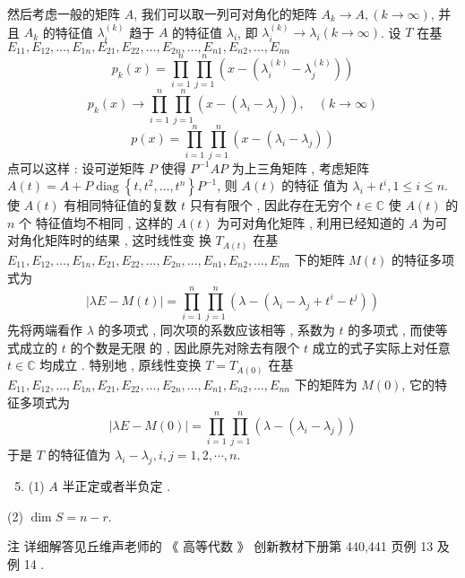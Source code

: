 \documentclass[10pt]{article}
\begin{document}
 然后考虑一般的矩阵  $A$,  我们可以取一列可对角化的矩阵  $A_{k} \rightarrow A,(k \rightarrow \infty)$,  并且  $A_{k}$  的特征值  $\lambda_{i}^{(k)}$  趋于  $A$  的特征值  $\lambda_{i}$,  即  $\lambda_{i}^{(k)} \rightarrow \lambda_{i}(k \rightarrow \infty)$.  设  $T$  在基  $E_{11}, E_{12}, \ldots, E_{1 n}, E_{21}, E_{22}, \ldots, E_{2 n}, \ldots, E_{n 1}, E_{n 2}, \ldots, E_{n n}$
$$
p_{k}(x)=\prod_{i=1}^{n} \prod_{j=1}^{n}\left(x-\left(\lambda_{i}^{(k)}-\lambda_{j}^{(k)}\right)\right)
$$
$$
p_{k}(x) \rightarrow \prod_{i=1}^{n} \prod_{j=1}^{n}\left(x-\left(\lambda_{i}-\lambda_{j}\right)\right), \quad(k \rightarrow \infty)
$$
$$
p(x)=\prod_{i=1}^{n} \prod_{j=1}^{n}\left(x-\left(\lambda_{i}-\lambda_{j}\right)\right)
$$
 点可以这样 :  设可逆矩阵  $P$  使得  $P^{-1} A P$  为上三角矩阵 ,  考虑矩阵  $A(t)=A+P \operatorname{diag}\left\{t, t^{2}, \ldots, t^{n}\right\} P^{-1}$,  则  $A(t)$  的特征   值为  $\lambda_{i}+t^{i}, 1 \leq i \leq n$.  使  $A(t)$  有相同特征值的复数  $t$  只有有限个 ,  因此存在无穷个  $t \in \mathbb{C}$  使  $A(t)$  的  $n$  个   特征值均不相同 ,  这样的  $A(t)$  为可对角化矩阵 ,  利用已经知道的  $A$  为可对角化矩阵时的结果 ,  这时线性变   换  $T_{A(t)}$  在基  $E_{11}, E_{12}, \ldots, E_{1 n}, E_{21}, E_{22}, \ldots, E_{2 n}, \ldots, E_{n 1}, E_{n 2}, \ldots, E_{n n}$  下的矩阵  $M(t)$  的特征多项式为 
$$
|\lambda E-M(t)|=\prod_{i=1}^{n} \prod_{j=1}^{n}\left(\lambda-\left(\lambda_{i}-\lambda_{j}+t^{i}-t^{j}\right)\right)
$$
 先将两端看作  $\lambda$  的多项式 ,  同次项的系数应该相等 ,  系数为  $t$  的多项式 ,  而使等式成立的  $t$  的个数是无限   的 ,  因此原先对除去有限个  $t$  成立的式子实际上对任意  $t \in \mathbb{C}$  均成立 .  特别地 ,  原线性变换  $T=T_{A(0)}$  在基  $E_{11}, E_{12}, \ldots, E_{1 n}, E_{21}, E_{22}, \ldots, E_{2 n}, \ldots, E_{n 1}, E_{n 2}, \ldots, E_{n n}$  下的矩阵为  $M(0)$,  它的特征多项式为 
$$
|\lambda E-M(0)|=\prod_{i=1}^{n} \prod_{j=1}^{n}\left(\lambda-\left(\lambda_{i}-\lambda_{j}\right)\right)
$$
 于是  $T$  的特征值为  $\lambda_{i}-\lambda_{j}, i, j=1,2, \cdots, n$.

\begin{enumerate}
  \setcounter{enumi}{4}
  \item (1) $A$  半正定或者半负定 .
\end{enumerate}
(2) $\operatorname{dim} S=n-r$.

 注   详细解答见丘维声老师的 《 高等代数 》 创新教材下册第  440,441  页例  13  及例  14 .
\end{document}
